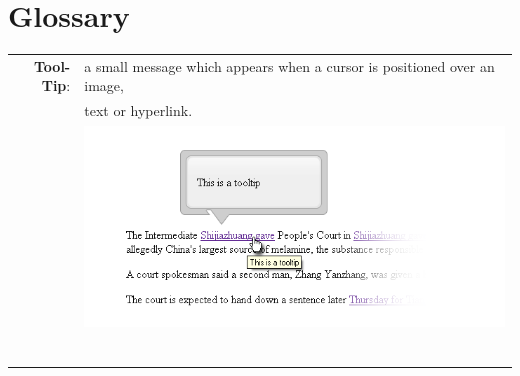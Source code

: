 \documentclass[12pt]{article}
\begin{document}
\part*{Glossary}
\begin{table}[!htb]
\begin{tabular}{rl}
\noindent \textbf{Tool-Tip}: & a small message which appears when a cursor is positioned over an image,\\
                             &  text or hyperlink.\\
                             & \includegraphics[scale=0.9]{tooltip}\\
                             & \\
                             & \\
                             & \\
                             & \\
                             & \\
                             & \\
\end{tabular}
\end{table}
\end{document}
